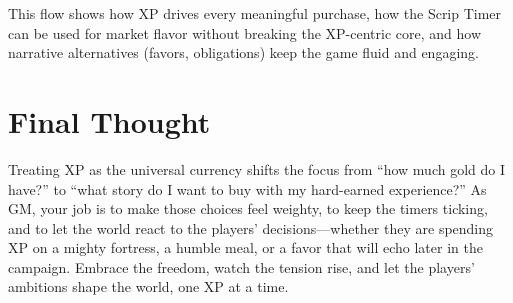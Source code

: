 This flow shows how XP drives every meaningful purchase, how the Scrip Timer can be used for market flavor without breaking the XP-centric core, and how narrative alternatives (favors, obligations) keep the game fluid and engaging.

\section{Final Thought}
Treating XP as the universal currency shifts the focus from ``how much gold do I have?'' to ``what story do I want to buy with my hard-earned experience?'' As GM, your job is to make those choices feel weighty, to keep the timers ticking, and to let the world react to the players' decisions---whether they are spending XP on a mighty fortress, a humble meal, or a favor that will echo later in the campaign. Embrace the freedom, watch the tension rise, and let the players' ambitions shape the world, one XP at a time.